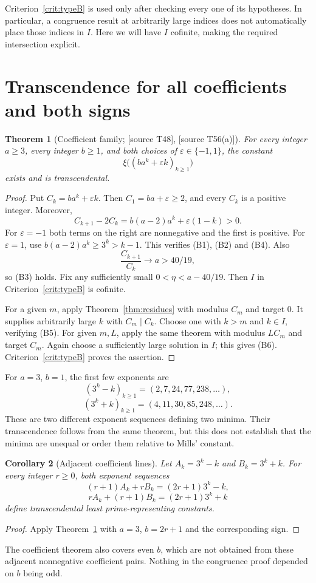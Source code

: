 \documentclass[11pt,a4paper]{article}
\newtheorem{theorem}{Theorem}[section]
\newtheorem{corollary}[theorem]{Corollary}
\theoremstyle{definition}\newtheorem{definition}[theorem]{Definition}
\theoremstyle{remark}\newtheorem{remark}[theorem]{Remark}
\newcommand{\sourceT}[1]{\textup{[source T#1]}}
\begin{document}
Criterion~\ref{crit:typeB} is used only after checking every one of its
hypotheses. In particular, a congruence result at arbitrarily large
indices does not automatically place those indices in $I$. Here we
will have $I$ cofinite, making the required intersection explicit.

\section{Transcendence for all coefficients and both signs}
\begin{theorem}[Coefficient family; \sourceT{48}, \sourceT{56(a)}]
\label{thm:family}
For every integer $a\ge3$, every integer $b\ge1$, and both choices
of $\varepsilon\in\{-1,1\}$, the constant
\[
 \xi\bigl((ba^k+\varepsilon k)_{k\ge1}\bigr)
\]
exists and is transcendental.
\end{theorem}
\begin{proof}
Put $C_k=ba^k+\varepsilon k$. Then $C_1=ba+\varepsilon\ge2$,
and every $C_k$ is a positive integer. Moreover,
\begin{equation}\label{eq:ratioineq}
 C_{k+1}-2C_k=b(a-2)a^k+\varepsilon(1-k)>0.
\end{equation}
For $\varepsilon=-1$ both terms on the right are nonnegative and the
first is positive. For $\varepsilon=1$, use
$b(a-2)a^k\ge3^k>k-1$. This verifies (B1), (B2) and (B4).
Also
\[
 \frac{C_{k+1}}{C_k}\longrightarrow a>40/19,
\]
so (B3) holds. Fix any sufficiently small
$0<\eta<a-40/19$. Then $I$ in Criterion~\ref{crit:typeB} is cofinite.

For a given $m$, apply Theorem~\ref{thm:residues} with modulus
$C_m$ and target $0$. It supplies arbitrarily large $k$ with
$C_m\mid C_k$. Choose one with $k>m$ and $k\in I$, verifying (B5).
For given $m,L$, apply the same theorem with modulus $LC_m$ and
target $C_m$. Again choose a sufficiently large solution in $I$;
this gives (B6). Criterion~\ref{crit:typeB} proves the assertion.
\end{proof}

For $a=3$, $b=1$, the first few exponents are
\[
 (3^k-k)_{k\ge1}=(2,7,24,77,238,\ldots),
\]
\[
 (3^k+k)_{k\ge1}=(4,11,30,85,248,\ldots).
\]
These are two different exponent sequences defining two minima. Their
transcendence follows from the same theorem, but this does not
establish that the minima are unequal or order them relative to
Mills' constant.

\begin{corollary}[Adjacent coefficient lines]\label{cor:adjacent}
Let $A_k=3^k-k$ and $B_k=3^k+k$. For every integer $r\ge0$, both
exponent sequences
\[
 (r+1)A_k+rB_k=(2r+1)3^k-k,
\]
\[
 rA_k+(r+1)B_k=(2r+1)3^k+k
\]
define transcendental least prime-representing constants.
\end{corollary}
\begin{proof}
Apply Theorem~\ref{thm:family} with $a=3$, $b=2r+1$ and the
corresponding sign.
\end{proof}
The coefficient theorem also covers even $b$, which are not obtained
from these adjacent nonnegative coefficient pairs. Nothing in the
congruence proof depended on $b$ being odd.
\end{document}
